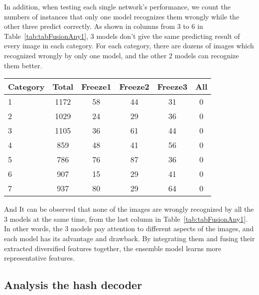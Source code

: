 In addition, when testing each single 
network’s performance, we count the numbers 
of instances that only one model recognizes 
them wrongly while the other three predict 
correctly. As shown in columns from 3 to 6 
in Table~\ref{tab:tabFusionAny1}, 3 models 
don’t give the same predicting result of
every image in each category. For each 
category, there are dozens of images which 
recognized wrongly by only one model, 
and the other 2 models can recognize them 
better.

\begin{table*}[!ht]
    \caption{Comparison of number of images 
        recognized wrongly by only one model}
    \label{tab:tabFusionAny1}
    \setlength{\arrayrulewidth}{1.05 pt}
    \renewcommand{\arraystretch}{1.1}
    \begin{tabular*}{1.0\textwidth}{
        @{
            \extracolsep{\fill}
        }lccccc
    }
        \hline
        
        Category & Total & Freeze1 & Freeze2 
        & Freeze3 & All \\
        
        \hline
        
        1 & 1172 & 58 & 44 & 31 & 0 \\
        2 & 1029 & 24 & 29 & 36 & 0 \\
        3 & 1105 & 36 & 61 & 44 & 0 \\
        4 &  859 & 48 & 41 & 56 & 0 \\
        5 &  786 & 76 & 87 & 36 & 0 \\
        6 &  907 & 15 & 29 & 41 & 0 \\
        7 &  937 & 80 & 29 & 64 & 0 \\
        
        \hline
    \end{tabular*}
\end{table*}

And It can be observed that none of the images 
are wrongly recognized by all the 3 models 
at the same time, from the last column in 
Table~\ref{tab:tabFusionAny1}. 
In other words, the 3 models pay attention 
to different aspects of the images, and each 
model has its advantage and drawback.
By integrating them and fusing their 
extracted diversified features together, 
the ensemble model learns more 
representative features.

\subsection{Analysis the hash decoder}
\label{ExpHash}

